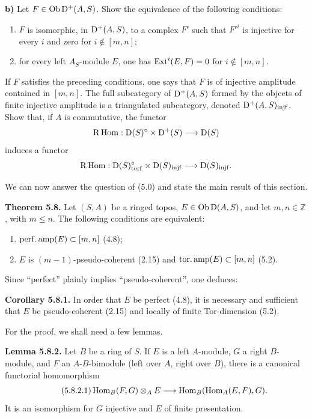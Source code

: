 \documentclass[11pt]{article}
\begin{document}
\textbf{b)} Let \(F\in\operatorname{Ob}\mathrm D^+(A,S)\). Show the equivalence of the following conditions:
\begin{enumerate}[label=(\roman*)]
\item \(F\) is isomorphic, in \(\mathrm D^+(A,S)\), to a complex \(F'\) such that \(F'^i\) is injective for every \(i\) and zero for \(i\notin[m,n]\);
\item for every left \(A_S\)-module \(E\), one has \(\operatorname{Ext}^i(E,F)=0\) for \(i\notin[m,n]\).
\end{enumerate}
If \(F\) satisfies the preceding conditions, one says that \(F\) is of injective amplitude contained in \([m,n]\). The full subcategory of \(\mathrm D^+(A,S)\) formed by the objects of finite injective amplitude is a triangulated subcategory, denoted \(\mathrm D^+(A,S)_{\operatorname{injf}}\). Show that, if \(A\) is commutative, the functor
\[
  \mathrm R\operatorname{Hom}:\mathrm D(S)^\circ\times\mathrm D^+(S)\longrightarrow \mathrm D(S)
\]
induces a functor
\[
  \mathrm R\operatorname{Hom}:\mathrm D(S)^\circ_{\operatorname{torf}}\times\mathrm D(S)_{\operatorname{injf}}
  \longrightarrow \mathrm D(S)_{\operatorname{injf}}.
\]

We can now answer the question of (5.0) and state the main result of this section.

\textbf{Theorem 5.8.} Let \((S,A)\) be a ringed topos, \(E\in\operatorname{Ob}\mathrm D(A,S)\), and let \(m,n\in\mathbb Z\), with \(m\leq n\). The following conditions are equivalent:
\begin{enumerate}[label=(\roman*)]
\item \(\operatorname{perf.amp}(E)\subset[m,n]\) (4.8);
\item \(E\) is \((m-1)\)-pseudo-coherent (2.15) and \(\operatorname{tor.amp}(E)\subset[m,n]\) (5.2).
\end{enumerate}
Since ``perfect'' plainly implies ``pseudo-coherent'', one deduces:

\textbf{Corollary 5.8.1.} In order that \(E\) be perfect (4.8), it is necessary and sufficient that \(E\) be pseudo-coherent (2.15) and locally of finite Tor-dimension (5.2).

For the proof, we shall need a few lemmas.

\textbf{Lemma 5.8.2.} Let \(B\) be a ring of \(S\). If \(E\) is a left \(A\)-module, \(G\) a right \(B\)-module, and \(F\) an \(A\)-\(B\)-bimodule (left over \(A\), right over \(B\)), there is a canonical functorial homomorphism
\begin{equation}\tag{5.8.2.1}
  \operatorname{Hom}_B(F,G)\otimes_A E
  \longrightarrow
  \operatorname{Hom}_B(\operatorname{Hom}_A(E,F),G).
\end{equation}
It is an isomorphism for \(G\) injective and \(E\) of finite presentation.
\end{document}
